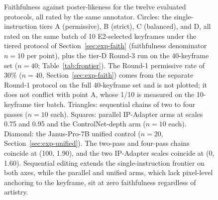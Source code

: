 \documentclass[10pt]{article}
\begin{document}
\begin{figure}[t]
\centering
{}
\caption{Faithfulness against poster-likeness for the twelve evaluated protocols, all rated by the same annotator. Circles: the single-instruction tiers A (permissive), B (strict), C (balanced), and D, all rated on the same batch of 10 E2-selected keyframes under the tiered protocol of Section~\ref{sec:exp-faith} (faithfulness denominator $n=10$ per point), plus the tier-D Round-3 run on the 40-keyframe set ($n=40$; Table~\ref{tab:frontier}). The Round-1 permissive rate of 30\% ($n=40$, Section~\ref{sec:exp-faith}) comes from the separate Round-1 protocol on the full 40-keyframe set and is not plotted; it does not conflict with point A, whose 1/10 is measured on the 10-keyframe tier batch. Triangles: sequential chains of two to four passes ($n=10$ each). Squares: parallel IP-Adapter arms at scales 0.75 and 0.95 and the ControlNet-depth arm ($n=10$ each). Diamond: the Janus-Pro-7B unified control ($n=20$, Section~\ref{sec:exp-unified}). The two-pass and four-pass chains coincide at (100, 1.90), and the two IP-Adapter scales coincide at (0, 1.60). Sequential editing extends the single-instruction frontier on both axes, while the parallel and unified arms, which lack pixel-level anchoring to the keyframe, sit at zero faithfulness regardless of artistry.}
\label{fig:frontier}
\end{figure}
\end{document}
